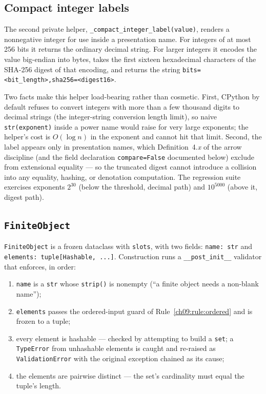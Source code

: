 \subsection{Compact integer labels}\label{ch09:sec:compact-label}

The second private helper, \texttt{\_compact\_integer\_label(value)},
renders a nonnegative integer for use inside a presentation name. For
integers of at most 256 bits it returns the ordinary decimal string. For
larger integers it encodes the value big-endian into bytes, takes the first
sixteen hexadecimal characters of the SHA-256 digest of that encoding, and
returns the string \texttt{bits=<bit\_length>,sha256=<digest16>}.

Two facts make this helper load-bearing rather than cosmetic. First, CPython
by default refuses to convert integers with more than a few thousand digits
to decimal strings (the integer-string conversion length limit), so naive
\texttt{str(exponent)} inside a power name would raise for very large
exponents; the helper's cost is $O(\log n)$ in the exponent and cannot hit
that limit. Second, the label appears only in presentation names, which
Definition~4.\emph{x} of the arrow discipline (and the field declaration
\texttt{compare=False} documented below) exclude from extensional equality
--- so the truncated digest cannot introduce a collision into any equality,
hashing, or denotation computation. The regression suite exercises exponents
$2^{30}$ (below the threshold, decimal path) and $10^{5000}$ (above it,
digest path).

\subsection{\texttt{FiniteObject}}\label{ch09:sec:finiteobject}

\begin{construction}\label{ch09:con:object}
\texttt{FiniteObject} is a frozen dataclass with \texttt{slots}, with two
fields: \texttt{name: str} and \texttt{elements: tuple[Hashable, ...]}.
Construction runs a \texttt{\_\_post\_init\_\_} validator that enforces, in
order:
\begin{enumerate}
\item \texttt{name} is a \texttt{str} whose \texttt{strip()} is nonempty
      (``a finite object needs a non-blank name'');
\item \texttt{elements} passes the ordered-input guard of
      Rule~\ref{ch09:rule:ordered} and is frozen to a tuple;
\item every element is hashable --- checked by attempting to build a
      \texttt{set}; a \texttt{TypeError} from unhashable elements is caught
      and re-raised as \texttt{ValidationError} with the original exception
      chained as its cause;
\item the elements are pairwise distinct --- the set's cardinality must
      equal the tuple's length.
\end{enumerate}
\end{construction}

